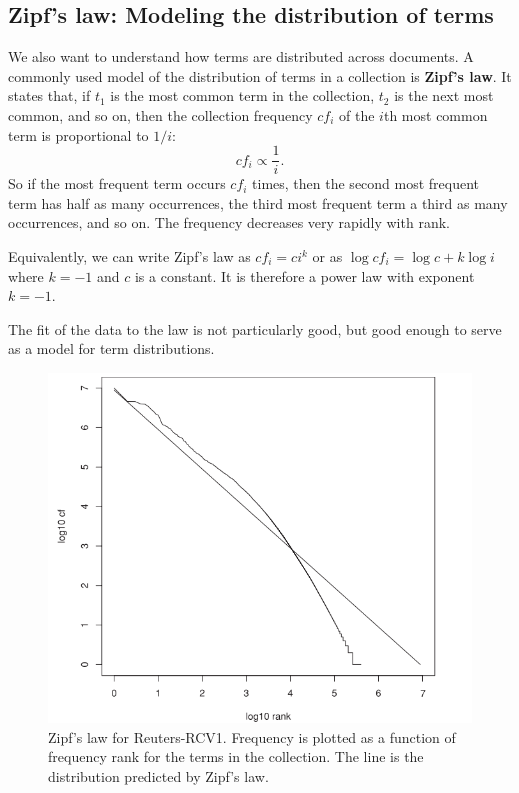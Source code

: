 \documentclass[letterpaper,11pt]{article}
\begin{document}
\subsection{Zipf’s law: Modeling the distribution of terms}
We also want to understand how terms are distributed across documents. A commonly used model of the distribution of terms in a collection is \textbf{Zipf’s law}. It states that, if $t_1$ is the most common term in the collection, $t_2$ is the next most common, and so on, then the collection frequency $cf_i$ of the $i$th most common term is proportional to $1/i$:
\[
cf_i \propto \frac{1}{i}.
\]
So if the most frequent term occurs $cf_i$ times, then the second most frequent term has half as many occurrences, the third most frequent term a third as many occurrences, and so on. The frequency decreases very rapidly with rank.

Equivalently, we can write Zipf’s law as $cf_i=ci^k$ or as $\log cf_i=\log c + k\log i$ where $k=−1$ and $c$ is a constant. It is therefore a power law with exponent $k=−1$.

The fit of the data to the law is not particularly good, but good enough to serve as a model for term distributions.

\begin{figure}[H]
    \centering
    \includegraphics[scale=0.60]{sect5/figure_5_2.png}
    \caption{Zipf’s law for Reuters-RCV1. Frequency is plotted as a function of frequency rank for the terms in the collection. The line is the distribution predicted by Zipf’s law.}
\end{figure}
\end{document}
